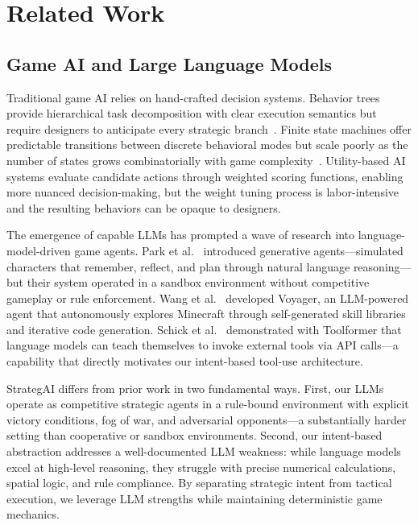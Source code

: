 \documentclass[conference]{IEEEtran}
\begin{document}
\FloatBarrier
\section{Related Work}
\label{sec:related}

\subsection{Game AI and Large Language Models}

Traditional game AI relies on hand-crafted decision systems. Behavior trees
provide hierarchical task decomposition with clear execution semantics but
require designers to anticipate every strategic
branch~\cite{simpson2014behaviortrees}. Finite state machines offer
predictable transitions between discrete behavioral modes but scale poorly
as the number of states grows combinatorially with game
complexity~\cite{rabin2013gameaipro}. Utility-based AI systems evaluate
candidate actions through weighted scoring functions, enabling more nuanced
decision-making, but the weight tuning process is labor-intensive and the
resulting behaviors can be opaque to designers.

The emergence of capable LLMs has prompted a wave of research into
language-model-driven game agents. Park et al.~\cite{park2023generative}
introduced generative agents---simulated characters that remember, reflect,
and plan through natural language reasoning---but their system operated in a
sandbox environment without competitive gameplay or rule enforcement.
Wang et al.~\cite{wang2023voyager} developed Voyager, an LLM-powered agent
that autonomously explores Minecraft through self-generated skill libraries
and iterative code generation. Schick et al.~\cite{schick2023toolformer}
demonstrated with Toolformer that language models can teach themselves to
invoke external tools via API calls---a capability that directly motivates
our intent-based tool-use architecture.

StrategAI differs from prior work in two fundamental ways. First, our LLMs
operate as competitive strategic agents in a rule-bound environment with
explicit victory conditions, fog of war, and adversarial opponents---a
substantially harder setting than cooperative or sandbox environments.
Second, our intent-based abstraction addresses a well-documented LLM
weakness: while language models excel at high-level reasoning, they
struggle with precise numerical calculations, spatial logic, and rule
compliance. By separating strategic intent from tactical execution, we
leverage LLM strengths while maintaining deterministic game mechanics.
\end{document}
